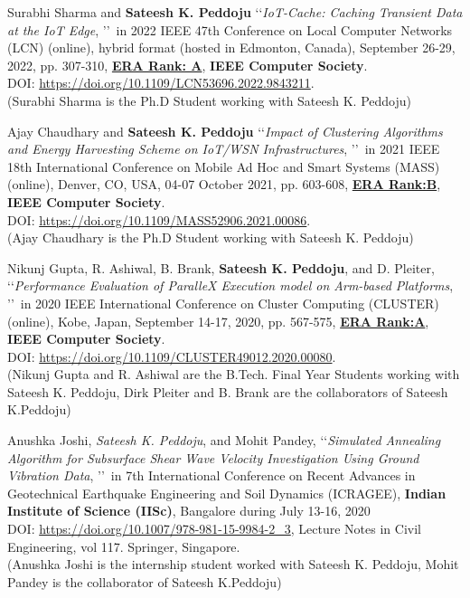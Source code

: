 \begin{etaremune}

    \item
    Surabhi Sharma and \textbf{Sateesh K. Peddoju} \lq\lq \textit{IoT-Cache: Caching Transient Data at the IoT Edge}, \rq\rq\, in 2022 IEEE 47th Conference on Local Computer Networks (LCN) (online), hybrid format (hosted in Edmonton, Canada), September 26-29, 2022, pp. 307-310, \underline{\textbf{ERA Rank: A}}, \textbf{IEEE Computer Society}. \\DOI: \url{https://doi.org/10.1109/LCN53696.2022.9843211}.
   \\(Surabhi Sharma is the Ph.D Student working with Sateesh K. Peddoju)

       \item
    Ajay Chaudhary and \textbf{Sateesh K. Peddoju} \lq\lq \textit{Impact of Clustering Algorithms and Energy Harvesting Scheme on IoT/WSN Infrastructures}, \rq\rq\, in 2021 IEEE 18th International Conference on Mobile Ad Hoc and Smart Systems (MASS) (online), Denver, CO, USA, 04-07 October 2021, pp. 603-608, \underline{\textbf{ERA Rank:B}}, \textbf{IEEE Computer Society}. \\DOI: \url{https://doi.org/10.1109/MASS52906.2021.00086}.
   \\(Ajay Chaudhary is the Ph.D Student working with Sateesh K. Peddoju)
    
    \item
    Nikunj Gupta, R. Ashiwal, B. Brank, \textbf{Sateesh K. Peddoju}, and D. Pleiter, \lq\lq \textit{Performance Evaluation of ParalleX Execution model on Arm-based Platforms}, \rq\rq\, in 2020 IEEE International Conference on Cluster Computing (CLUSTER) (online), Kobe, Japan, September 14-17, 2020, pp. 567-575, \underline{\textbf{ERA Rank:A}}, \textbf{IEEE Computer Society}. \\DOI: \url{https://doi.org/10.1109/CLUSTER49012.2020.00080}.
   \\(Nikunj Gupta and R. Ashiwal are the B.Tech. Final Year Students working with Sateesh K. Peddoju, Dirk Pleiter and B. Brank are the collaborators of Sateesh K.Peddoju)


       \item
    Anushka Joshi, \textit{Sateesh K. Peddoju}, and Mohit Pandey, \lq\lq \textit{Simulated Annealing Algorithm for Subsurface Shear Wave Velocity Investigation Using Ground Vibration Data}, \rq\rq\, in 7th International Conference on Recent Advances in Geotechnical Earthquake Engineering and Soil Dynamics (ICRAGEE), \textbf{Indian Institute of Science (IISc)}, Bangalore during July 13-16, 2020 \\DOI: \url{https://doi.org/10.1007/978-981-15-9984-2_3},  Lecture Notes in Civil Engineering, vol 117. Springer, Singapore. 
   \\(Anushka Joshi is the internship student worked with Sateesh K. Peddoju, Mohit Pandey is the collaborator of Sateesh K.Peddoju)
    

\end{etaremune}

